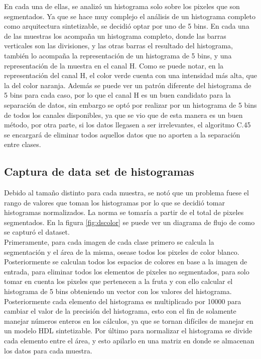 \documentclass[twoside,spanish,ESP,MSc]{plantillaLabUPV}
\theoremstyle{definition}
\begin{document}
En cada una de ellas, se analizó un histograma solo sobre los pixeles que son segmentados. Ya que se hace muy complejo el análisis de un histograma completo como arquitectura sintetizable, se decidió optar por uno de 5 bins. En cada una de las muestras los acompaña un histograma completo, donde las barras verticales son las divisiones, y las otras barras el resultado del histograma, también lo acompaña la representación de un histograma de 5 bins, y una representación de la muestra en el canal H. Como se puede notar, en la representación del canal H, el color verde cuenta con una intensidad más alta, que la del color naranja. Además se puede ver un patrón diferente del histograma de 5 bins para cada caso, por lo que el canal H es un buen candidato para la separación de datos, sin embargo se optó por realizar por un histograma de 5 bins de todos los canales disponibles, ya que se vio que de esta manera es un buen método, por otra parte, si los datos llegasen a ser irrelevantes, el algoritmo C.45 se encargará de eliminar todos aquellos datos que no aporten a la separación entre clases. 

\subsection{Captura de data set de histogramas}

Debido al tamaño distinto para cada muestra, se notó que un problema fuese el rango de valores que toman los histogramas por lo que se decidió tomar histogramas normalizados. La norma se tomaría a partir de el total de pixeles segmentados. En la figura \ref{fig:dscolor} se puede ver un diagrama de flujo de como se capturó el dataset. \\

Primeramente, para cada imagen de cada clase primero se calcula la segmentación y el área de la misma, osease todos los pixeles de color blanco. Posteriormente se calculan todos los espacios de colores en base a la imagen de entrada, para eliminar todos los elementos de pixeles no segmentados, para solo tomar en cuenta los pixeles que pertenecen a la fruta y con ello calcular el histograma de 5 bins obteniendo un vector con los valores del histograma. Posteriormente cada elemento del histograma es multiplicado por 10000 para cambiar el valor de la precisión del histograma, esto con el fin de solamente manejar números enteros en los cálculos, ya que se tornan difíciles de manejar en un modelo HDL sintetizable. Por último para normalizar el histograma se divide cada elemento entre el área, y esto apilarlo en una matriz en donde se almacenan los datos para cada muestra. \\
\end{document}
